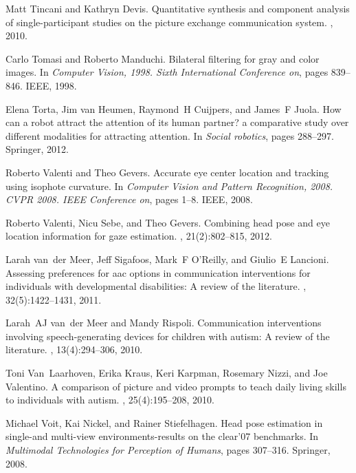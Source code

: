 \documentclass{ut-thesis}
\providecommand{\DIFaddend}{} %
\begin{document}
\begin{thebibliography}{100}
\DIFaddend {}
Matt Tincani and Kathryn Devis.
\newblock Quantitative synthesis and component analysis of single-participant
  studies on the picture exchange communication system.
, 2010.

Carlo Tomasi and Roberto Manduchi.
\newblock Bilateral filtering for gray and color images.
\newblock In {\em Computer Vision, 1998. Sixth International Conference on},
  pages 839--846. IEEE, 1998.

Elena Torta, Jim van Heumen, Raymond~H Cuijpers, and James~F Juola.
\newblock How can a robot attract the attention of its human partner? a
  comparative study over different modalities for attracting attention.
\newblock In {\em Social robotics}, pages 288--297. Springer, 2012.

Roberto Valenti and Theo Gevers.
\newblock Accurate eye center location and tracking using isophote curvature.
\newblock In {\em Computer Vision and Pattern Recognition, 2008. CVPR 2008.
  IEEE Conference on}, pages 1--8. IEEE, 2008.

Roberto Valenti, Nicu Sebe, and Theo Gevers.
\newblock Combining head pose and eye location information for gaze estimation.
, 21(2):802--815, 2012.

Larah van~der Meer, Jeff Sigafoos, Mark~F O’Reilly, and Giulio~E Lancioni.
\newblock Assessing preferences for aac options in communication interventions
  for individuals with developmental disabilities: A review of the literature.
, 32(5):1422--1431, 2011.

Larah~AJ van~der Meer and Mandy Rispoli.
\newblock Communication interventions involving speech-generating devices for
  children with autism: A review of the literature.
, 13(4):294--306, 2010.

Toni Van~Laarhoven, Erika Kraus, Keri Karpman, Rosemary Nizzi, and Joe
  Valentino.
\newblock A comparison of picture and video prompts to teach daily living
  skills to individuals with autism.
,
  25(4):195--208, 2010.

Michael Voit, Kai Nickel, and Rainer Stiefelhagen.
\newblock Head pose estimation in single-and multi-view environments-results on
  the clear’07 benchmarks.
\newblock In {\em Multimodal Technologies for Perception of Humans}, pages
  307--316. Springer, 2008.


\end{thebibliography}
\end{document}

